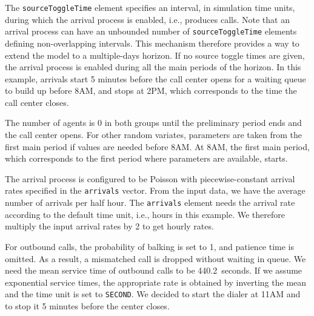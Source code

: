The \texttt{source\-Toggle\-Time} element
specifies an interval, in simulation time units, during which
the arrival process is enabled, i.e., produces calls.
Note that an arrival process can have an unbounded number
of \texttt{source\-Toggle\-Time} elements defining non-overlapping
intervals.
This mechanism therefore provides a way to extend
the model to a multiple-days horizon.
If no source toggle times are given, the arrival process
is enabled during all the main periods of the horizon.
In this example,
arrivals start 5 minutes before the call center opens for a waiting
queue to build up before 8AM, and
stops at 2PM, which corresponds to the time the call center
closes.

The number of agents is 0 in both groups until the preliminary period
ends and the call center opens.
For other random variates,
parameters are taken from the first main period if values are needed
before 8AM.
At 8AM, the first main period, which corresponds to the first period
where parameters are available, starts.

The arrival process is configured to be Poisson
with piecewise-constant arrival rates specified in
the \texttt{arrivals} vector.
From the input data, we have the average number of arrivals per half hour.
The \texttt{arrivals} element needs the arrival rate according to the
default time unit, i.e., hours in this example.  We therefore multiply
the input arrival rates by 2 to get hourly rates.

For outbound calls, the probability of balking is set
to 1, and patience time is omitted.
As a result, a mismatched call is dropped without
waiting in queue.
We need the mean service time of outbound calls to be 440.2~seconds.
If we assume exponential service times, the appropriate rate
is obtained by inverting the mean and the time unit is set to
\texttt{SECOND}.
We decided to start the dialer at 11AM and to stop it 5 minutes
before the center closes.

